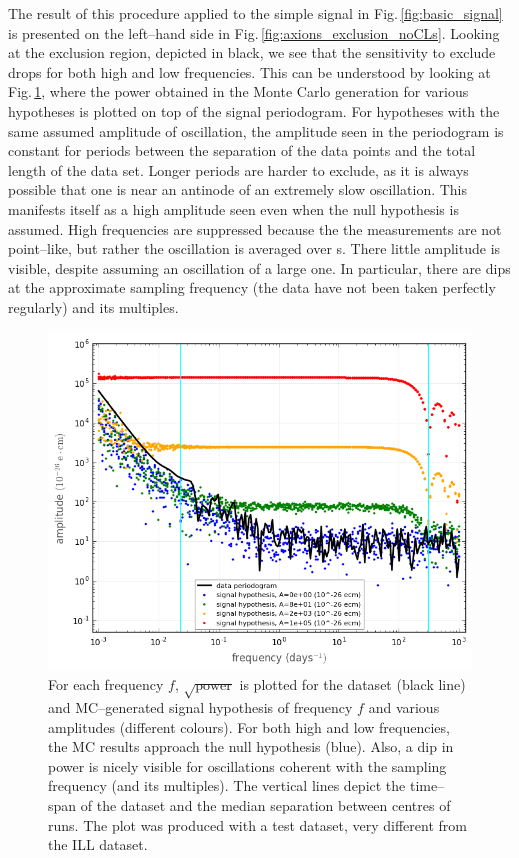 The result of this procedure applied to the simple signal in Fig.\,\ref{fig:basic_signal} is presented on the left--hand side in Fig.\,\ref{fig:axions_exclusion_noCLs}. Looking at the exclusion region, depicted in black, we see that the sensitivity to exclude drops for both high and low frequencies. This can be understood by looking at Fig.\,\ref{fig:sensitivity}, where the power obtained in the Monte Carlo generation for various hypotheses is plotted on top of the signal periodogram. For hypotheses with the same assumed amplitude of oscillation, the amplitude seen in the periodogram is constant for periods between the separation of the data points and the total length of the data set. Longer periods are harder to exclude, as it is always possible that one is near an antinode of an extremely slow oscillation. This manifests itself as a high amplitude seen even when the null hypothesis is assumed. High frequencies are suppressed because the the measurements are not point--like, but rather the oscillation is averaged over \unit[1]{s}. There little amplitude is visible, despite assuming an oscillation of a large one. In particular, there are dips at the approximate sampling frequency (the data have not been taken perfectly regularly) and its multiples.

\begin{figure}
  \centering \includegraphics[width=\linewidth]{gfx/axions/sensitivity.png}
  \caption{For each frequency $f$, $\sqrt{\text{power}}$ is plotted for the dataset (black line) and MC--generated signal hypothesis of frequency $f$ and various amplitudes (different colours). For both high and low frequencies, the MC results approach the null hypothesis (blue). Also, a dip in power is nicely visible for oscillations coherent with the sampling frequency (and its multiples). The vertical lines depict the time--span of the dataset and the median separation between centres of runs.  The plot was produced with a test dataset, very different from the ILL dataset.}
  \label{fig:sensitivity}
\end{figure}

